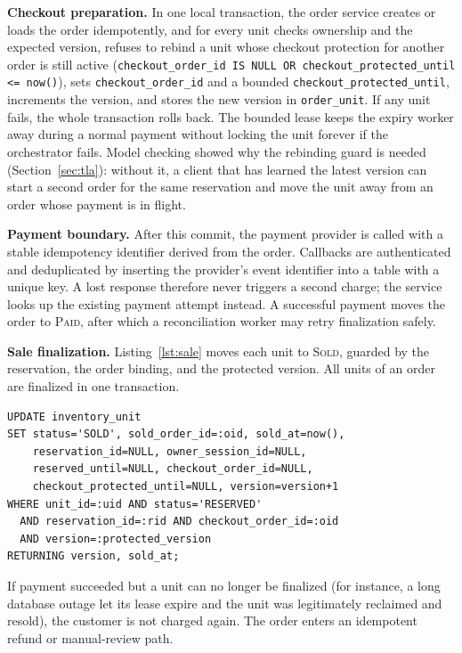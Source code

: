 \documentclass[conference]{IEEEtran}
\newcommand{\So}{\textsc{Sold}}
\begin{document}
\textbf{Checkout preparation.}
In one local transaction, the order service creates or loads the
order idempotently, and for every unit checks ownership and the
expected version, refuses to rebind a unit whose checkout protection
for another order is still active (\texttt{checkout\_order\_id IS NULL
OR checkout\_protected\_until <= now()}), sets
\texttt{checkout\_order\_id} and a bounded
\texttt{checkout\_protected\_until}, increments the version, and stores
the new version in \texttt{order\_unit}. If any unit fails, the whole
transaction rolls back. The bounded lease keeps the expiry worker away
during a normal payment without locking the unit forever if the
orchestrator fails. Model checking showed why the rebinding guard is
needed (Section~\ref{sec:tla}): without it, a client that has learned
the latest version can start a second order for the same reservation
and move the unit away from an order whose payment is in flight.

\textbf{Payment boundary.}
After this commit, the payment provider is called with a stable
idempotency identifier derived from the order. Callbacks are
authenticated and deduplicated by inserting the provider's event
identifier into a table with a unique key. A lost response therefore
never triggers a second charge; the service looks up the existing
payment attempt instead. A successful payment moves the order to
\textsc{Paid}, after which a reconciliation worker may retry
finalization safely.

\textbf{Sale finalization.}
Listing~\ref{lst:sale} moves each unit to \So, guarded by the
reservation, the order binding, and the protected version. All units
of an order are finalized in one transaction.

\begin{lstlisting}[caption={Conditional sale finalization.}, label={lst:sale}]
UPDATE inventory_unit
SET status='SOLD', sold_order_id=:oid, sold_at=now(),
    reservation_id=NULL, owner_session_id=NULL,
    reserved_until=NULL, checkout_order_id=NULL,
    checkout_protected_until=NULL, version=version+1
WHERE unit_id=:uid AND status='RESERVED'
  AND reservation_id=:rid AND checkout_order_id=:oid
  AND version=:protected_version
RETURNING version, sold_at;
\end{lstlisting}

If payment succeeded but a unit can no longer be finalized (for
instance, a long database outage let its lease expire and the unit
was legitimately reclaimed and resold), the customer is not charged
again. The order enters an idempotent refund or manual-review path.
\end{document}
